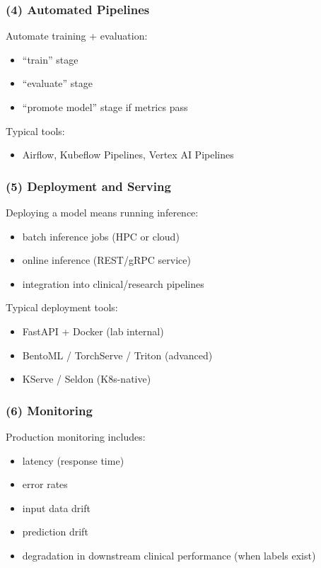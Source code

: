 \documentclass[11pt]{article}
\begin{document}
\subsubsection{(4) Automated Pipelines}
Automate training + evaluation:
\begin{itemize}
  \item ``train'' stage
  \item ``evaluate'' stage
  \item ``promote model'' stage if metrics pass
\end{itemize}

Typical tools:
\begin{itemize}
  \item Airflow, Kubeflow Pipelines, Vertex AI Pipelines
\end{itemize}

\subsubsection{(5) Deployment and Serving}
Deploying a model means running inference:
\begin{itemize}
  \item batch inference jobs (HPC or cloud)
  \item online inference (REST/gRPC service)
  \item integration into clinical/research pipelines
\end{itemize}

Typical deployment tools:
\begin{itemize}
  \item FastAPI + Docker (lab internal)
  \item BentoML / TorchServe / Triton (advanced)
  \item KServe / Seldon (K8s-native)
\end{itemize}

\subsubsection{(6) Monitoring}
Production monitoring includes:
\begin{itemize}
  \item latency (response time)
  \item error rates
  \item input data drift
  \item prediction drift
  \item degradation in downstream clinical performance (when labels exist)
\end{itemize}
\end{document}
